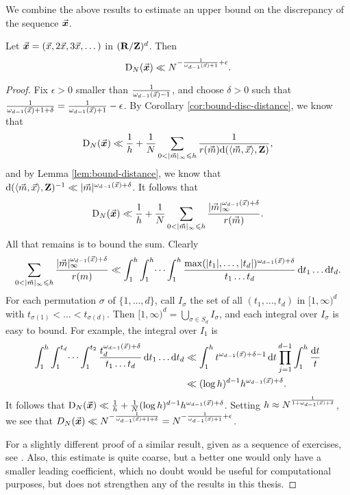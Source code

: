 We combine the above results to estimate an upper bound on the discrepancy of 
the sequence $\vec{\boldsymbol x}$. 

\begin{theorem}\label{thm:disc-upper-bound}
Let $\vec{\boldsymbol x}=(\vec{x},2\vec{x},3\vec{x},\dots)$ in $(\mathbf{R}/\mathbf{Z})^d$. Then 
\[
	\operatorname{D}_N(\vec{\boldsymbol x}) \ll N^{-\frac{1}{\omega_{d-1}(\vec{x})+1}+\epsilon} .
\]
\end{theorem}
\begin{proof}
Fix $\epsilon>0$ smaller than $\frac{1}{\omega_{d-1}(\vec{x}) - 1}$, and choose 
$\delta>0$ such that 
$\frac{1}{\omega_{d-1}(\vec{x})+1+\delta} = \frac{1}{\omega_{d-1}(\vec{x})+1} - \epsilon$. 
By Corollary \ref{cor:bound-disc-distance}, we know that 
\[
	\D_N(\bvx) \ll \frac 1 h + \frac 1 N \sum_{0<|\vm|_\infty \leqslant h} \frac{1}{r(\vm) \dd(\langle \vm,\vx\rangle,\bZ)} ,
\]
and by Lemma \ref{lem:bound-distance}, we know that 
$\mathrm{d}(\langle \vec{m},\vec{x}\rangle,\mathbf{Z})^{-1} \ll |\vec{m}|^{\omega_{d-1}(\vec{x})+\delta}$. 
It follows that 
\[
	\operatorname{D}_N(\vec{\boldsymbol x}) \ll \frac 1 h + \frac 1 N \sum_{0 < |\vec{m}|_\infty \leqslant h} \frac{|\vec{m}|_\infty^{\omega_{d-1}(\vec{x})+\delta}}{r(\vec{m})} .
\]
All that remains is to bound the sum. Clearly 
\[
	\sum_{0 < |\vec{m}|_\infty \leqslant h} \frac{|\vec{m}|_\infty^{\omega_{d-1}(\vec{x}) + \delta}}{r(m)} \ll \int_1^h \int_1^h \dots \int_1^h \frac{\max(|t_1|,\dots,|t_d|)^{\omega_{d-1}(\vec{x})+\delta}}{t_1 \dots t_d}\, \mathrm{d} t_1 \dots \mathrm{d} t_d .
\]
For each permutation $\sigma$ of $\{1,\dots,d\}$, call $I_\sigma$ the set of 
all $(t_1,\dots,t_d)$ in $[1,\infty)^d$ with 
$t_{\sigma(1)} < \dots < t_{\sigma(d)}$. Then 
$[1,\infty)^d = \bigcup_{\sigma\in S_d} I_\sigma$, and each integral over 
$I_\sigma$ is easy to bound. For example, the integral over $I_1$ is 
\begin{align*}
	\int_1^h \int_1^{t_d} \dots \int_1^{t_2} \frac{t_d^{\omega_{d-1}(\vec{x})+\delta}}{t_1 \dots t_d}\, \mathrm{d} t_1 \dots \mathrm{d} t_d 
		&\ll \int_1^h t^{\omega_{d-1}(\vec{x})+\delta-1}\, \mathrm{d} t \prod_{j=1}^{d-1} \int_1^h \frac{\mathrm{d} t}{t} \\
		&\ll (\log h)^{d-1} h^{\omega_{d-1}(\vec{x})+\delta} .
\end{align*}
It follows that 
$\operatorname{D}_N(\vec{\boldsymbol x}) \ll \frac 1 h + \frac 1 N (\log h)^{d-1} h^{\omega_{d-1}(\vec{x})+\delta}$. 
Setting $h\approx N^{\frac{1}{1+\omega_{d-1}(\vec{x})+\delta}}$, we see that 
$D_N(\vec{\boldsymbol x}) \ll N^{-\frac{1}{\omega_{d-1}(\vec{x})+1+\delta}} = N^{-\frac{1}{\omega_{d-1}(\vec{x})+1} + \epsilon}$. 

For a slightly different proof of a similar result, given as a sequence of 
exercises, see  \cite[Ch.~2, Ex.~3.15, 16, 17]{kuipers-niederreiter-1974}. 
Also, this estimate is quite coarse, but a better one would only have a smaller 
leading coefficient, which no doubt would be useful for computational 
purposes, but does not strengthen any of the results in this thesis.  
\end{proof}

